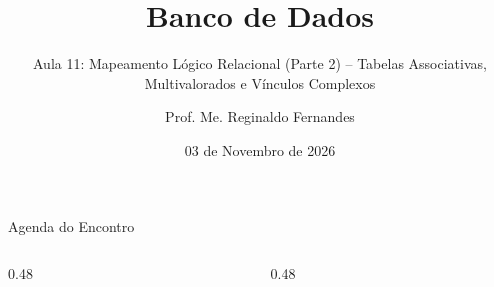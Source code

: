 \documentclass[aspectratio=169,utf8,t]{beamer}
\author{Prof. Me. Reginaldo Fernandes}
\institute{Instituto Federal do Ceará -- Campus Tauá \\ Tecnologia em Telemática}
\title{Banco de Dados}
\subtitle{Aula 11: Mapeamento Lógico Relacional (Parte 2) -- Tabelas Associativas, Multivalorados e Vínculos Complexos}
\date{03 de Novembro de 2026}
\begin{document}
\frame[plain]{\titlepage}

\begin{frame}{Agenda do Encontro}
  \begin{columns}[t]
    \begin{column}{0.48\textwidth}
      \scriptsize
      \tableofcontents[sections={1-5}]
    \end{column}
    \begin{column}{0.48\textwidth}
      \scriptsize
      \tableofcontents[sections={6-9}]
    \end{column}
  \end{columns}
\end{frame}










\end{document}
